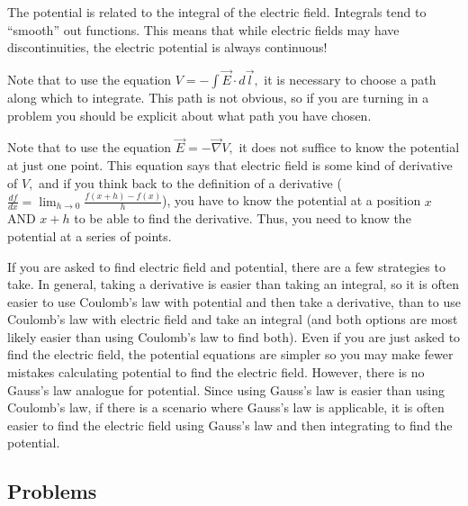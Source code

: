 \documentclass[12pt]{book}
\begin{document}
The potential is related to the integral of the electric field. Integrals tend to ``smooth'' out functions. This means that while electric fields may have discontinuities, the electric potential is always continuous!

Note that to use the equation $V = -\int \vec{E} \cdot d\vec{l},$ it is necessary to choose a path along which to integrate. This path is not obvious, so if you are turning in a problem you should be explicit about what path you have chosen.

Note that to use the equation $\vec{E} = -\vec{\nabla} V,$ it does not suffice to know the potential at just one point. This equation says that electric field is some kind of derivative of $V,$ and if you think back to the definition of a derivative ($\frac{df}{dx} = \displaystyle\lim_{h\to0} \frac{f(x+h)-f(x)}{h}$), you have to know the potential at a position $x$ AND $x+h$ to be able to find the derivative. Thus, you need to know the potential at a series of points.

If you are asked to find electric field and potential, there are a few strategies to take. In general, taking a derivative is easier than taking an integral, so it is often easier to use Coulomb's law with potential and then take a derivative, than to use Coulomb's law with electric field and take an integral (and both options are most likely easier than using Coulomb's law to find both). Even if you are just asked to find the electric field, the potential equations are simpler so you may make fewer mistakes calculating potential to find the electric field. However, there is no Gauss's law analogue for potential. Since using Gauss's law is easier than using Coulomb's law, if there is a scenario where Gauss's law is applicable, it is often easier to find the electric field using Gauss's law and then integrating to find the potential. 

\pagebreak

\subsection{Problems}
\end{document}
